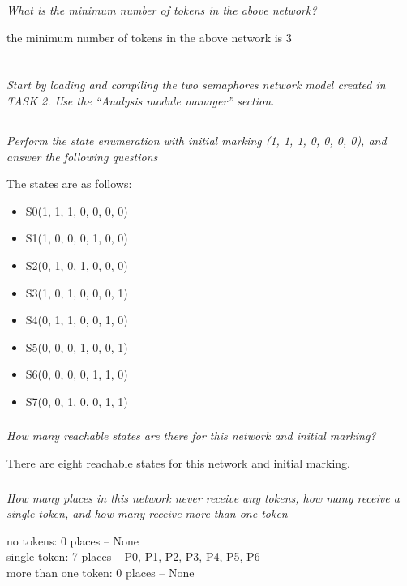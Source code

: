 \documentclass[letterpaper]{article}
\begin{document}
\vspace{1cm}
\textit{What is the minimum number of tokens in the above network?}

the minimum number of tokens in the above network is 3

\section{}

\textit{Start by loading and compiling the two semaphores network model created in TASK 2. Use the “Analysis module manager” section.}

\subsection{}
\textit{Perform the state enumeration with initial marking (1, 1, 1, 0, 0, 0, 0), and answer the following questions}

The states are as follows:
\begin{itemize}
 \item S0(1, 1, 1, 0, 0, 0, 0)
 \item S1(1, 0, 0, 0, 1, 0, 0)
 \item S2(0, 1, 0, 1, 0, 0, 0)
 \item S3(1, 0, 1, 0, 0, 0, 1)
 \item S4(0, 1, 1, 0, 0, 1, 0)
 \item S5(0, 0, 0, 1, 0, 0, 1)
 \item S6(0, 0, 0, 0, 1, 1, 0)
 \item S7(0, 0, 1, 0, 0, 1, 1)
\end{itemize}

\subsubsection{}
\textit{How many reachable states are there for this network and initial marking?}

There are eight reachable states for this network and initial marking.

\subsubsection{}
\textit{How many places in this network never receive any tokens, how many receive a single token, and how many receive more than one token}

no tokens: 0 places -- None\\
single token: 7 places -- P0, P1, P2, P3, P4, P5, P6\\
more than one token: 0 places -- None\\
\end{document}
